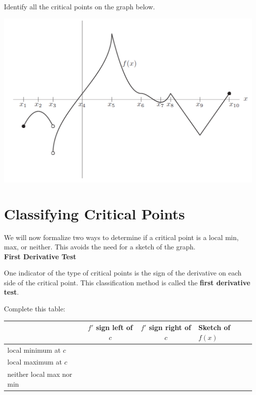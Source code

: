 \newpage


\problem Identify all the critical points on the graph below.

\includegraphics[width=8in]{graphics/notes_03_crit_pnt_oddities}

\newpage


\section*{Classifying Critical Points}

We will now formalize two ways to determine if a critical point is a
local min, max, or neither. This avoids the need for a sketch of the
graph. \\[2ex]
\newpage
{\bf First Derivative Test}

One indicator of the type of critical points is the sign of the
derivative on each side of the critical point.  This classification
method is called the {\bf{first derivative test}}.

\problem Complete this table:
{\LARGE
\vspace{1mm}
\begin{center}
\begin{tabular}{|l|c|c|p{2.1in}|} \hline
\qquad \qquad \qquad \qquad \qquad &  $f'$ sign left of $c$ & $f'$ sign right of $c$ & Sketch of $f(x)$  \\ \hline
local minimum at $c$ & & &\\[1.0in] \hline
local maximum at $c$ & & &\\[1.0in] \hline
neither local max nor min & & &\\[1.0in] \hline
\end{tabular}
\end{center}
}

